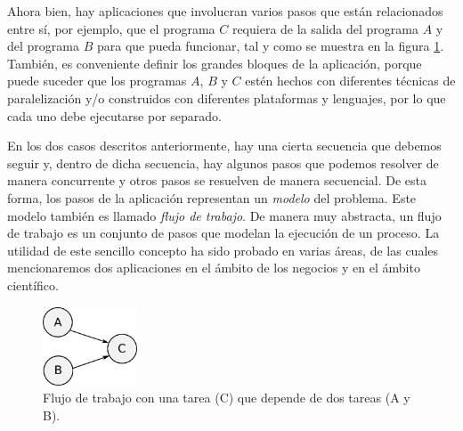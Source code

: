 Ahora bien, hay aplicaciones que involucran varios pasos que están relacionados entre sí, por ejemplo, que el programa $C$ requiera de la salida del programa $A$ y del programa $B$ para que pueda funcionar, tal y como se muestra en la figura \ref{fig:workflowABC}. También, es conveniente definir los grandes bloques de la aplicación, porque puede suceder que los programas $A$, $B$ y $C$ estén hechos con diferentes técnicas de paralelización y/o construidos con diferentes plataformas y lenguajes, por lo que cada uno debe ejecutarse por separado. 

En los dos casos descritos anteriormente, hay una cierta secuencia que debemos seguir y, dentro de dicha secuencia, hay algunos pasos que podemos resolver de manera concurrente y otros pasos se resuelven de manera secuencial. De esta forma, los pasos de la aplicación representan un \emph{modelo} del problema. Este modelo también es llamado \emph{flujo de trabajo}. De manera muy abstracta, un flujo de trabajo es un conjunto de pasos que modelan la ejecución de un proceso. La utilidad de este sencillo concepto ha sido probado en varias áreas, de las cuales mencionaremos dos aplicaciones en el ámbito de los negocios y en el ámbito científico.

\begin{figure}
    \begin{center}
        \includegraphics[width=0.25\textwidth]{imagenes/workflowABC}
    \end{center}
    \caption{Flujo de trabajo con una tarea (C) que depende de dos tareas (A y B).}
    \label{fig:workflowABC}
\end{figure} 

